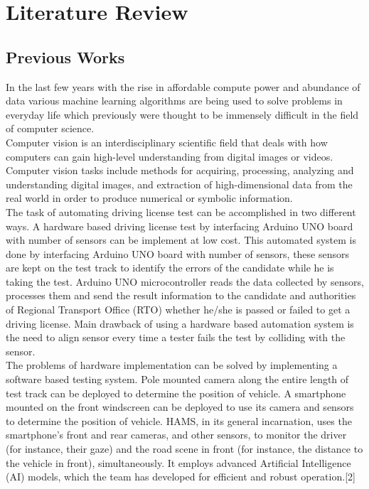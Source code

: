 \chapter{Literature Review}
\section{Previous Works}
In the last few years with the rise in affordable compute power and abundance of data various machine learning algorithms are being used to solve problems in everyday life which previously were thought to be immensely difficult in the field of computer science.
\\
Computer vision is an interdisciplinary scientific field that deals with how computers can gain high-level understanding from digital images or videos. Computer vision tasks include methods for acquiring, processing, analyzing and understanding digital images, and extraction of high-dimensional data from the real world in order to produce numerical or symbolic information.\\
The task of automating driving license test can be accomplished in two different ways. A hardware based driving license test by interfacing Arduino UNO board with number of sensors can be implement at low cost. This automated system is done by interfacing Arduino UNO board with number of sensors, these sensors are kept on the test track to identify the errors of the candidate while he is taking the test. Arduino UNO microcontroller reads the data collected by sensors, processes them and send the result information to the candidate and authorities of Regional Transport Office (RTO) whether he/she is passed or failed to get a driving license\cite{femto_anup}. Main drawback of using a hardware based automation system is the need to align sensor every time a tester fails the test by colliding with the sensor. 
\\
The problems of hardware implementation can be solved by implementing a software based testing system. Pole mounted camera along the entire length of test track can be deployed to determine the position of vehicle. A smartphone mounted on the front windscreen can be deployed to use its camera and sensors to determine the position of vehicle.
HAMS, in its general incarnation, uses the smartphone’s front and rear cameras, and other sensors, to monitor the driver (for instance, their gaze) and the road scene in front (for instance, the distance to the vehicle in front), simultaneously. It employs advanced Artificial Intelligence (AI) models, which the team has developed for efficient and robust operation\cite{bordia2020automated}.[2]


